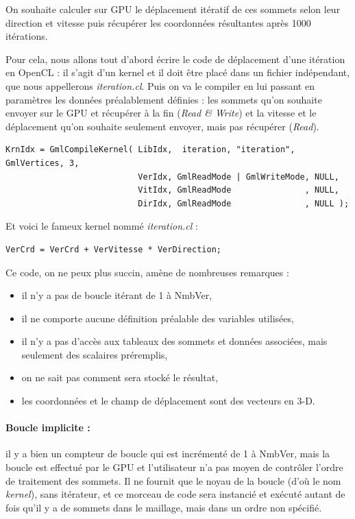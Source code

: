 \documentclass[a4paper,12pt]{article}
\begin{document}
On souhaite calculer sur GPU le déplacement itératif de ces sommets selon leur direction et vitesse puis récupérer les coordonnées résultantes après 1000 itérations.

Pour cela, nous allons tout d'abord écrire le code de déplacement d'une itération en OpenCL : il s'agit d'un kernel et il doit être placé dans un fichier indépendant, que nous appellerons \emph{iteration.cl}.
Puis on va le compiler en lui passant en paramètres les données préalablement définies : les sommets qu'on souhaite envoyer sur le GPU et récupérer à la fin (\emph{Read \& Write}) et la vitesse et le déplacement qu'on souhaite seulement envoyer, mais pas récupérer (\emph{Read}).

\begin{tt}
\begin{verbatim}
KrnIdx = GmlCompileKernel( LibIdx,  iteration, "iteration", GmlVertices, 3,
                           VerIdx, GmlReadMode | GmlWriteMode, NULL,
                           VitIdx, GmlReadMode               , NULL,
                           DirIdx, GmlReadMode               , NULL );
\end{verbatim}
\end{tt}
\normalfont

Et voici le fameux kernel nommé \emph{iteration.cl} : 

\begin{tt}
\begin{verbatim}
VerCrd = VerCrd + VerVitesse * VerDirection;
\end{verbatim}
\end{tt}
\normalfont

Ce code, on ne peux plus succin, amène de nombreuses remarques :

\begin{itemize}
\item il n'y a pas de boucle itérant de 1 à NmbVer,
\item il ne comporte aucune définition préalable des variables utilisées,
\item il n'y a pas d'accès aux tableaux des sommets et données associées, mais seulement des scalaires préremplis,
\item on ne sait pas comment sera stocké le résultat,
\item les coordonnées et le champ de déplacement sont des vecteurs en 3-D.
\end{itemize}

\paragraph{Boucle implicite : } il y a bien un compteur de boucle qui est incrémenté de 1 à NmbVer, mais la boucle est effectué par le GPU et l'utilisateur n'a pas moyen de contrôler l'ordre de traitement des sommets.
Il ne fournit que le noyau de la boucle (d'où le nom \emph{kernel}), sans itérateur, et ce morceau de code sera instancié et exécuté autant de fois qu'il y a de sommets dans le maillage, mais dans un ordre non spécifié.
\end{document}
